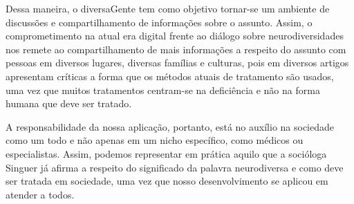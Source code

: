 Dessa maneira, o diversaGente tem como objetivo tornar-se um ambiente de discussões e compartilhamento de informações sobre o assunto. Assim, o comprometimento na atual era digital frente ao diálogo sobre neurodiversidades nos remete ao compartilhamento de mais informações a respeito do assunto com pessoas em diversos lugares, diversas famílias e culturas, pois em diversos artigos apresentam críticas a forma que os métodos atuais de tratamento são usados, uma vez que muitos tratamentos centram-se na deficiência e não na forma humana que deve ser tratado\cite{machado}. 

A responsabilidade da nossa aplicação, portanto, está no auxílio na sociedade como um todo e não apenas em um nicho específico, como médicos ou especialistas. Assim, podemos representar em prática aquilo que a socióloga Singuer já afirma a respeito do significado da palavra neurodiversa e como deve ser tratada em sociedade, uma vez que nosso desenvolvimento se aplicou em atender a todos. 



